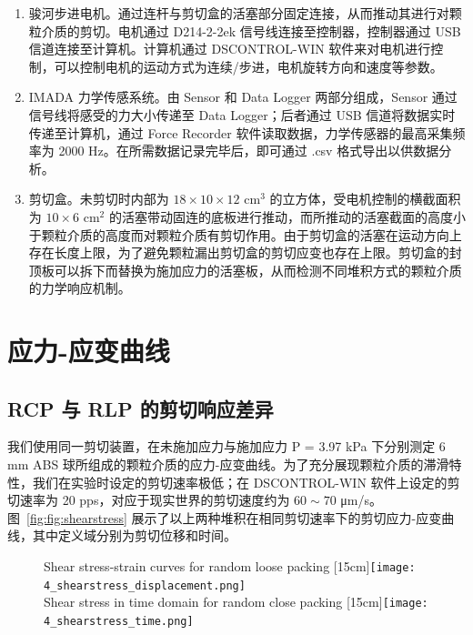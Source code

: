 \begin{enumerate}
    \item 骏河步进电机。通过连杆与剪切盒的活塞部分固定连接，从而推动其进行对颗粒介质的剪切。电机通过 D214-2-2ek 信号线连接至控制器，控制器通过 USB 信道连接至计算机。计算机通过 DSCONTROL-WIN 软件来对电机进行控制，可以控制电机的运动方式为连续/步进，电机旋转方向和速度等参数。
    \item IMADA 力学传感系统。由 Sensor 和 Data Logger 两部分组成，Sensor 通过信号线将感受的力大小传递至 Data Logger；后者通过 USB 信道将数据实时传递至计算机，通过 Force Recorder 软件读取数据，力学传感器的最高采集频率为 2000 \unit{\hertz}。在所需数据记录完毕后，即可通过 .csv 格式导出以供数据分析。
    \item 剪切盒。未剪切时内部为 $18\times 10\times 12$ $\unit{\centi\meter}^{3}$ 的立方体，受电机控制的横截面积为 $10\times 6$ $\unit{\centi\meter}^{2}$ 的活塞带动固连的底板进行推动，而所推动的活塞截面的高度小于颗粒介质的高度而对颗粒介质有剪切作用。由于剪切盒的活塞在运动方向上存在长度上限，为了避免颗粒漏出剪切盒的剪切应变也存在上限。剪切盒的封顶板可以拆下而替换为施加应力的活塞板，从而检测不同堆积方式的颗粒介质的力学响应机制。
\end{enumerate}

\section{应力-应变曲线}

\subsection{RCP 与 RLP 的剪切响应差异}

我们使用同一剪切装置，在未施加应力与施加应力 P = 3.97 \unit{\kilo\pascal} 下分别测定 6 \unit{\milli\meter} ABS 球所组成的颗粒介质的应力-应变曲线。为了充分展现颗粒介质的滞滑特性，我们在实验时设定的剪切速率极低；在 DSCONTROL-WIN 软件上设定的剪切速率为 20 \unit{pps}，对应于现实世界的剪切速度约为 $60\sim 70$ \unit{\micro\meter}/\unit{\second}。图~\ref{fig:fig:shearstress} 展示了以上两种堆积在相同剪切速率下的剪切应力-应变曲线，其中定义域分别为剪切位移和时间。

\begin{figure}[htbp]
	\centering
                  {Shear stress-strain curves for random loose packing}%
                  [15cm]{\texttt{[image: 4\_shearstress\_displacement.png]}}\\
                  {Shear stress in time domain for random close packing}%
                  [15cm]{\texttt{[image: 4\_shearstress\_time.png]}}
  \label{fig:shearstress}
\end{figure}

